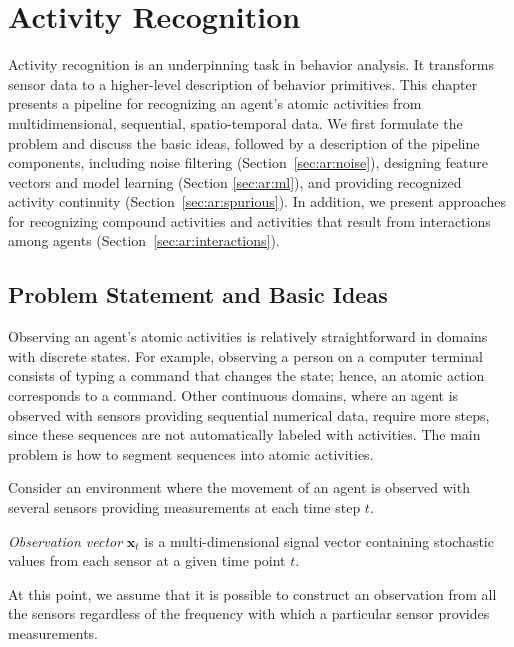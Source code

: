 
%
%
\chapter{Activity Recognition}
\label{chap:activity_recognition}
Activity recognition is an underpinning task in behavior analysis. It transforms sensor data to a higher-level description of behavior primitives. This chapter presents a pipeline for recognizing an agent's atomic activities from multidimensional, sequential, spatio-temporal data. We first formulate the problem and discuss the basic ideas, followed by a description of the pipeline components, including noise filtering (Section~\ref{sec:ar:noise}), designing feature vectors and model learning (Section \ref{sec:ar:ml}), and providing recognized activity continuity (Section~\ref{sec:ar:spurious}). In addition, we present approaches for recognizing compound activities and activities that result from interactions among agents (Section~\ref{sec:ar:interactions}). %



\section{Problem Statement and Basic Ideas}
\label{sec:ar:problem}

Observing an agent's atomic activities is relatively straightforward in domains with discrete states. For example, observing a person on a computer terminal consists of typing a command that changes the state; hence, an atomic action corresponds to a command. Other continuous domains, where an agent is observed with sensors providing sequential numerical data, require more steps, since these sequences are not automatically labeled with activities. The main problem is how to segment sequences into atomic activities.

Consider an environment where the movement of an agent is observed with several sensors providing measurements at each time step $t$.
\begin{definition}
\label{def:observation}
	\emph{Observation vector} $\mathbf{x}_t$ is a multi-dimensional signal vector containing stochastic values from each sensor at a given time point $t$. 
\end{definition}
\noindent At this point, we assume that it is possible to construct an observation from all the sensors regardless of the frequency with which a particular sensor provides measurements.

